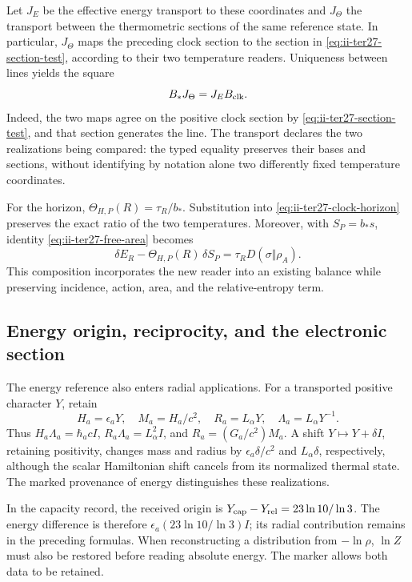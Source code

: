 Let $J_E$ be the effective energy transport to these coordinates and
$J_\Theta$ the transport between the thermometric sections of the same
reference state. In particular, $J_\Theta$ maps the preceding clock
section to the section in \eqref{eq:ii-ter27-section-test}, according to
their two temperature readers. Uniqueness between lines yields the square
\begin{equation}
 B_*J_\Theta=J_EB_{\rm clk}.
 \label{eq:ii-ter27-intertwiner}
\end{equation}
Indeed, the two maps agree on the positive clock section by
\eqref{eq:ii-ter27-section-test}, and that section generates the line.
The transport declares the two realizations being compared: the typed
equality preserves their bases and sections, without identifying by
notation alone two differently fixed temperature coordinates.

For the horizon, $\Theta_{H,P}(R)=\tau_R/b_*$. Substitution into
\eqref{eq:ii-ter27-clock-horizon} preserves the exact ratio of the two
temperatures. Moreover, with $S_P=b_*s$, identity
\eqref{eq:ii-ter27-free-area} becomes
\[
 \delta E_R-\Theta_{H,P}(R)\,\delta S_P
 =\tau_RD(\sigma\Vert\rho_A).
\]
This composition incorporates the new reader into an existing balance
while preserving incidence, action, area, and the relative-entropy term.

\subsection{Energy origin, reciprocity, and the electronic section}
\label{subsec:ii-ter27-electron}

The energy reference also enters radial applications. For a transported
positive character $Y$, retain
\[
 H_a=\epsilon_aY,\quad M_a=H_a/c^2,\quad
 R_a=L_\alpha Y,\quad \Lambda_a=L_\alpha Y^{-1}.
\]
Thus $H_a\Lambda_a=\hbar_acI$, $R_a\Lambda_a=L_\alpha^2I$, and
$R_a=(G_a/c^2)M_a$. A shift $Y\mapsto Y+\delta I$, retaining positivity,
changes mass and radius by $\epsilon_a\delta/c^2$ and
$L_\alpha\delta$, respectively, although the scalar Hamiltonian shift
cancels from its normalized thermal state. The marked provenance of
energy distinguishes these realizations.

In the capacity record, the received origin is
$Y_{\rm cap}-Y_{\rm rel}=23\ln10/\ln3$.
The energy difference is therefore
$\epsilon_a(23\ln10/\ln3)I$; its radial contribution remains in the
preceding formulas. When reconstructing a distribution from $-\ln\rho$,
$\ln Z$ must also be restored before reading absolute energy. The marker
allows both data to be retained.

